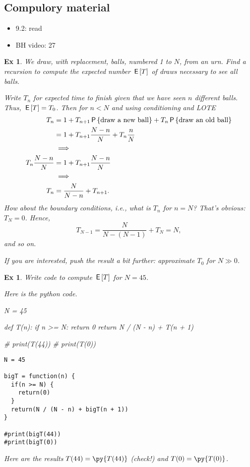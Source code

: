 \documentclass[a4paper,11pt]{article}
\newtheorem{exercise}[theorem]{Ex}
\begin{document}
\subsection{Compulory material}
\label{sec:compulory-material}

\begin{itemize}
\item 9.2: read
\item BH video: 27
\end{itemize}


\begin{exercise}
We draw, with replacement, balls, numbered 1 to $N$, from an urn.
Find a recursion to compute the expected number $\E T$ of draws necessary to see all balls.
\begin{solution}
Write $T_{n}$ for expected time to finish given that we have seen $n$ different balls. Thus, $\E T = T_{0}$.
Then for $n< N$ and using conditioning and LOTE
\begin{align}
T_n
&= 1
+T_{n+1} \P{\text{draw a new ball}}
+T_{n} \P{\text{draw an old ball}}  \\
&= 1
+T_{n+1} \frac{N-n}{N}
+T_{n} \frac{n}{N} \\
&\implies\\
T_n \frac{N-n}{N} &= 1 +T_{n+1} \frac{N-n}{N} \\
&\implies \\
T_n &= \frac{N}{N-n}  +T_{n+1}.
\end{align}
How about the boundary conditions, i.e., what is $T_{n}$ for $n=N$?
That's obvious: $T_{N} = 0$. Hence,
\begin{equation}
T_{N-1} = \frac{N}{N-(N-1)} + T_{N} = N,
\end{equation}
and so on.

If you are interested,  push the result a bit further: approximate $T_{0}$ for $N\gg 0$.
\end{solution}
\end{exercise}


\begin{exercise}
Write code to compute $\E T$ for $N=45$.
\begin{solution}
Here is the python code.

\begin{pyblock}
N = 45


def T(n):
    if n >= N:
        return 0
    return N / (N - n) + T(n + 1)

# print(T(44))
# print(T(0))
\end{pyblock}
\begin{verbatim}
N = 45

bigT = function(n) {
  if(n >= N) {
    return(0)
  }
  return(N / (N - n) + bigT(n + 1))
}

#print(bigT(44))
#print(bigT(0))
\end{verbatim}
Here are the results $T(44) = \py{T(44)}$ (check!) and $T(0) = \py{T(0)}$.
\end{solution}
\end{exercise}
\end{document}
